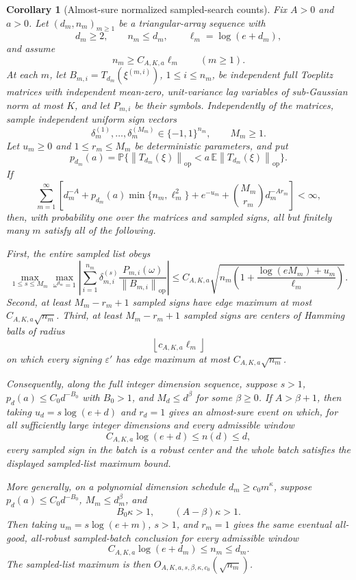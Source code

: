 \documentclass[11pt]{amsart}
\numberwithin{equation}{section}
\newtheorem{corollary}[theorem]{Corollary}
\theoremstyle{definition}
\theoremstyle{remark}
\newcommand{\op}{\mathrm{op}}
\newcommand{\Prob}{\mathbb P}
\newcommand{\Exp}{\mathbb E}
\newcommand{\norm}[1]{\left\lVert #1\right\rVert}
\newcommand{\eps}{\varepsilon}
\begin{document}
\begin{corollary}[Almost-sure normalized sampled-search counts]
\label{cor:normalizer-tail-borel-counts}
Fix \(A>0\) and \(a>0\).  Let \((d_m,n_m)_{m\ge1}\) be a triangular-array
sequence with
\[
  d_m\ge2,\qquad n_m\le d_m,\qquad \ell_m=\log(e+d_m),
\]
and assume
\[
  n_m\ge C_{A,K,a}\ell_m\qquad(m\ge1).
\]
At each \(m\), let \(B_{m,i}=T_{d_m}(\xi^{(m,i)})\), \(1\le i\le n_m\), be
independent full Toeplitz matrices with independent mean-zero, unit-variance
lag variables of sub-Gaussian norm at most \(K\), and let \(P_{m,i}\) be their
symbols.  Independently of the matrices, sample independent uniform sign
vectors
\[
  \delta_m^{(1)},\ldots,\delta_m^{(M_m)}\in\{-1,1\}^{n_m},
  \qquad M_m\ge1 .
\]
Let \(u_m\ge0\) and \(1\le r_m\le M_m\) be deterministic parameters, and put
\[
  p_{d_m}(a)
  =\Prob\{\norm{T_{d_m}(\xi)}_{\op}
  <a\,\Exp\norm{T_{d_m}(\xi)}_{\op}\}.
\]
If
\[
  \sum_{m=1}^\infty
  \left[
  d_m^{-A}+p_{d_m}(a)\min\{n_m,\ell_m^2\}
  +e^{-u_m}+\binom{M_m}{r_m}d_m^{-A r_m}
  \right]<\infty ,
\]
then, with probability one over the matrices and sampled signs, all but
finitely many \(m\) satisfy all of the following.

First, the entire sampled list obeys
\[
  \max_{1\le s\le M_m}\max_{\omega^{d_m}=1}
  \left|\sum_{i=1}^{n_m}\delta_{m,i}^{(s)}
  \frac{P_{m,i}(\omega)}{\norm{B_{m,i}}_{\op}}\right|
  \le
  C_{A,K,a}\sqrt{
    n_m\left(1+\frac{\log(eM_m)+u_m}{\ell_m}\right)} .
\]
Second, at least \(M_m-r_m+1\) sampled signs have edge maximum at most
\(C_{A,K,a}\sqrt{n_m}\).  Third, at least \(M_m-r_m+1\) sampled signs are
centers of Hamming balls of radius
\[
  \left\lfloor c_{A,K,a}\ell_m\right\rfloor
\]
on which every signing \(\eps'\) has edge maximum at most
\(C_{A,K,a}\sqrt{n_m}\).

Consequently, along the full integer dimension sequence, suppose \(s>1\),
\(p_d(a)\le C_0d^{-B_0}\) with \(B_0>1\), and \(M_d\le d^\beta\) for some
\(\beta\ge0\).  If \(A>\beta+1\), then taking \(u_d=s\log(e+d)\) and
\(r_d=1\) gives an almost-sure event on which, for all sufficiently large
integer dimensions and every admissible window
\[
  C_{A,K,a}\log(e+d)\le n(d)\le d,
\]
every sampled sign in the batch is a robust center and the whole batch satisfies
the displayed sampled-list maximum bound.

More generally, on a polynomial dimension schedule \(d_m\ge c_0m^\kappa\),
suppose \(p_d(a)\le C_0d^{-B_0}\), \(M_m\le d_m^\beta\), and
\[
  B_0\kappa>1,\qquad (A-\beta)\kappa>1 .
\]
Then taking \(u_m=s\log(e+m)\), \(s>1\), and \(r_m=1\) gives the same eventual
all-good, all-robust sampled-batch conclusion for every admissible window
\[
  C_{A,K,a}\log(e+d_m)\le n_m\le d_m.
\]
The sampled-list maximum is then \(O_{A,K,a,s,\beta,\kappa,c_0}(\sqrt{n_m})\).
\end{corollary}
\end{document}
